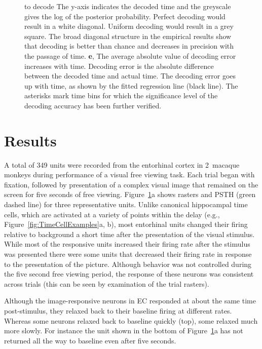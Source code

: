 \documentclass{apa}
\begin{document}
\begin{figure}
{			to decode  The y-axis indicates the decoded time and the greyscale
			gives the log of the posterior probability.  Perfect decoding
			would result in a white diagonal.  Uniform decoding would result
			in a grey square.   The broad diagonal structure in the empirical
			results show that decoding is better than chance and decreases in
			precision with the passage of time.
			\textbf{e}, The average absolute value of decoding error increases
			with time.  Decoding error is the absolute difference between the
			decoded time and actual time.   The decoding error goes up with
			time, as shown by the fitted regression line (black line).  The
			asterisks mark time bins for which the significance level of the
			decoding accuracy has been further verified.  
			\label{fig:SingleCellResults}
	}
\end{figure}


\section{Results}


A total of 349 units were recorded from the entorhinal cortex in 2~macaque
monkeys during performance of a visual free viewing task.  Each trial began
with fixation, followed by presentation of a complex visual image that remained on the
screen for five seconds of free viewing.
Figure~\ref{fig:SingleCellResults}a  shows rasters and PSTH
(green dashed line) for three
representative units.  Unlike canonical hippocampal time cells, which are
activated at a variety of points within the delay (e.g.,
Figure~\ref{fig:TimeCellExamples}a, b), most entorhinal units changed their firing
relative to background a short time after the presentation of the visual
stimulus.
While most of the responsive units increased their firing rate after the
stimulus was presented there were some units that decreased their firing rate
in response to the presentation of the picture.  Although behavior was not
controlled during the five second free viewing period, the response of these
neurons was consistent across trials (this can be seen by examination of the
trial rasters).

Although the image-responsive neurons in EC responded at about the same time
post-stimulus, they relaxed back to their baseline firing at different rates.
Whereas some neurons relaxed back to baseline quickly (top), some relaxed much
more slowly.  For instance the unit shown in the bottom of
Figure~\ref{fig:SingleCellResults}a has not returned all the way to baseline
even after five seconds.
\end{document}

